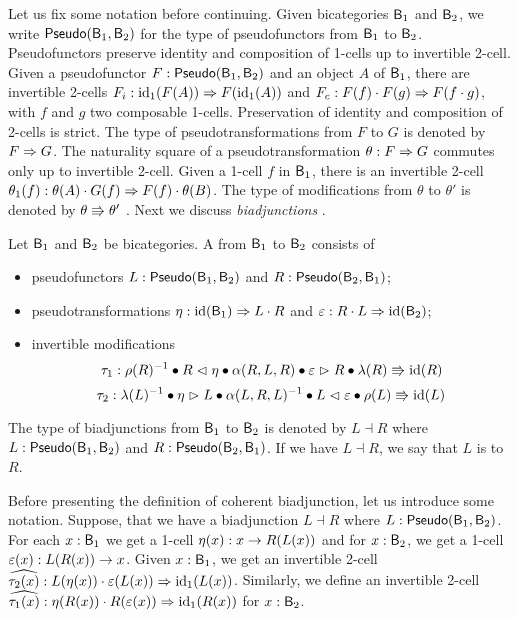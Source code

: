 Let us fix some notation before continuing.  Given bicategories $\mathsf{B}_1$
and $\mathsf{B}_2$, we write $\mathsf{Pseudo}(\mathsf{B}_1, \mathsf{B}_2)$ for the type of
pseudofunctors from $\mathsf{B}_1$ to $\mathsf{B}_2$. Pseudofunctors preserve identity
and composition of 1-cells up to invertible 2-cell. Given a
pseudofunctor $F : \mathsf{Pseudo}(\mathsf{B}_1, \mathsf{B}_2)$ and an object $A$ of $\mathsf{B}_1$,
there are invertible 2-cells ${F}_i :\operatorname{id}_1(F(A)) \Rightarrow
F(\operatorname{id}_1(A))$ and ${F}_c : F(f) \cdot F(g) \Rightarrow F(f \cdot
g)$, with $f$ and $g$ two composable 1-cells. Preservation of identity
and composition of 2-cells is strict.
The type of pseudotransformations from $F$ to $G$ is denoted by
$F \Rightarrow G$.
The naturality square of a pseudotransformation $\theta : F \Rightarrow G$ commutes only up to invertible 2-cell. Given a 1-cell $f$ in $\mathsf{B}_1$, there is an invertible 2-cell $\theta_1(f) : \theta(A) \cdot G(f) \Rightarrow F(f) \cdot \theta(B)$.
The type of modifications from $\theta$ to
$\theta'$ is denoted by $\theta \Rrightarrow \theta'$
\cite{leinster:basic-bicats}.  Next we discuss \emph {biadjunctions}
\cite{gurski2012biequivalences,LACK2000179}.

\begin{definition}
Let $\mathsf{B}_1$ and $\mathsf{B}_2$ be bicategories.
A  from $\mathsf{B}_1$ to $\mathsf{B}_2$ consists of
\begin{itemize}
	\item pseudofunctors $L : \mathsf{Pseudo}(\mathsf{B}_1, \mathsf{B}_2)$ and $R : \mathsf{Pseudo}(\mathsf{B}_2, \mathsf{B}_1)$;
	\item pseudotransformations $\eta : \operatorname{id}(\mathsf{B}_1) \Rightarrow L \cdot R$ and $\varepsilon : R \cdot L \Rightarrow \operatorname{id}(\mathsf{B}_2)$;
	\item invertible modifications
	\[
	\tau_1 : \rho(R)^{-1} \bullet R \vartriangleleft \eta \bullet \alpha(R, L, R) \bullet \varepsilon \vartriangleright R \bullet \lambda(R) \Rrightarrow \operatorname{id}(R)
	\]
	\[
	\tau_2 : \lambda(L)^{-1} \bullet \eta \vartriangleright L \bullet \alpha(L, R, L)^{-1} \bullet L \vartriangleleft \varepsilon \bullet \rho(L) \Rrightarrow \operatorname{id}(L)
	\]
\end{itemize}
The type of biadjunctions from $\mathsf{B}_1$ to $\mathsf{B}_2$ is denoted by $L \dashv R$
where $L : \mathsf{Pseudo}(\mathsf{B}_1, \mathsf{B}_2)$ and $R : \mathsf{Pseudo}(\mathsf{B}_2, \mathsf{B}_1)$.
If we have $L \dashv R$, we say that $L$ is  to $R$.
\end{definition}

Before presenting the definition of coherent biadjunction, let us introduce some notation.
Suppose, that we have a biadjunction $L \dashv R$ where $L : \mathsf{Pseudo}(\mathsf{B}_1, \mathsf{B}_2)$.
For each $x : \mathsf{B}_1$ we get a 1-cell $\eta(x) : x \rightarrow R(L(x))$ and for $x : \mathsf{B}_2$, we get a 1-cell $\varepsilon(x) : L(R(x)) \rightarrow x$.
Given $x : \mathsf{B}_1$, we get an invertible 2-cell $\widehat{\tau_2(x)} : L(\eta(x)) \cdot \varepsilon(L(x)) \Rightarrow \operatorname{id}_1(L(x))$.
Similarly, we define an invertible 2-cell $\widehat{\tau_1(x)} : \eta(R(x)) \cdot R(\varepsilon(x)) \Rightarrow \operatorname{id}_1(R(x))$ for $x : \mathsf{B}_2$.

